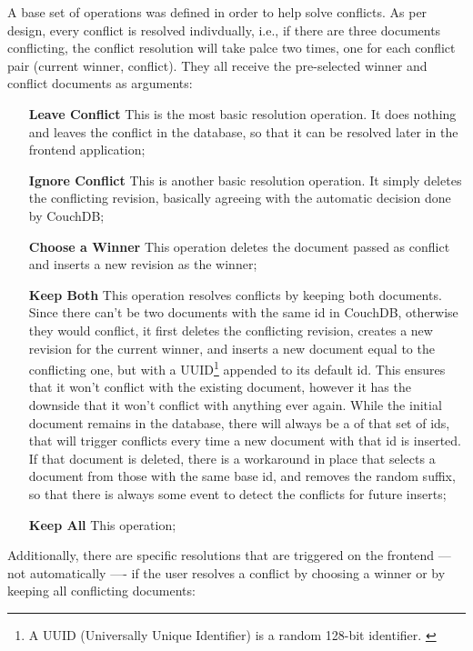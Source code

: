 A base set of operations was defined in order to help solve conflicts. As per design, every conflict is resolved indivdually, i.e., if there are three documents conflicting, the conflict resolution will take palce two times, one for each conflict pair (current winner, conflict). They all receive the pre-selected winner and conflict documents as arguments:
\begin{itemize}[leftmargin  = 3.25\parindent, align=left]
    \item[\textbf{Leave Conflict}] This is the most basic resolution operation. It does nothing and leaves the conflict in the database, so that it can be resolved later in the frontend application;
    \item[\textbf{Ignore Conflict}] This is another basic resolution operation. It simply deletes the conflicting revision, basically agreeing with the automatic decision done by CouchDB;
    \item[\textbf{Choose a Winner}] This operation deletes the document passed as conflict and inserts a new revision as the winner;
    \item[\textbf{Keep Both}] This operation resolves conflicts by keeping both documents. Since there can't be two documents with the same id in CouchDB, otherwise they would conflict, it first deletes the conflicting revision, creates a new revision for the current winner, and inserts a new document equal to the conflicting one, but with a UUID\footnote{A UUID (Universally Unique Identifier) is a random 128-bit identifier. \cite{uuid-rfc}} appended to its default id. This ensures that it won't conflict with the existing document, however it has the downside that it won't conflict with anything ever again. While the initial document remains in the database, there will always be a  of that set of ids, that will trigger conflicts every time a new document with that id is inserted. If that document is deleted, there is a workaround in place that selects a document from those with the same base id, and removes the random suffix, so that there is always some event to detect the conflicts for future inserts;
    \item[\textbf{Keep All}] This operation;
\end{itemize}

Additionally, there are specific resolutions that are triggered on the frontend --- not automatically ---- if the user resolves a conflict by choosing a winner or by keeping all conflicting documents:


